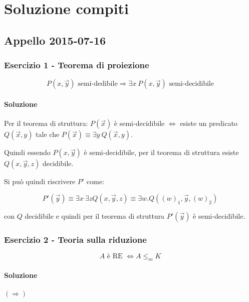 \chapter{Soluzione compiti}

\section{Appello 2015-07-16}

\subsection{Esercizio 1 - Teorema di proiezione}

$$
P(x,\vec{y}) \text{ semi-dedibile} \Rightarrow \exists x \: P(x,\vec{y}) \text{ semi-decidibile}
$$

\subsubsection{Soluzione}

Per il teorema di struttura: $P(\vec{x})$ è semi-decidibile $\Leftrightarrow$ esiste un predicato $Q(\vec{x}, y)$ tale che $P(\vec{x}) \equiv \exists y \: Q(\vec{x}, y)$.

Quindi essendo $P(x,\vec{y})$ è semi-decidibile, per il teorema di struttura esiste $Q(x, \vec{y}, z)$ decidibile.

Si può quindi riscrivere $P'$ come:

$$
P'(\vec{y}) \equiv \exists x \: \exists z Q(x, \vec{y}, z) \equiv \exists w . Q( (w)_1, \vec{y}, (w)_2)
$$

con $Q$ decidibile e quindi per il teorema di struttura $P'(\vec{y})$ è semi-decidibile.

\subsection{Esercizio 2 - Teoria sulla riduzione}

$$
A \text{ è RE } \Leftrightarrow A \leq_m K
$$

\subsubsection{Soluzione}

\paragraph{$(\Rightarrow)$} 

